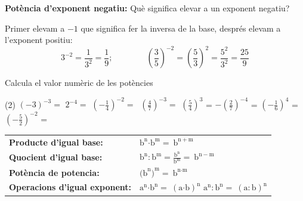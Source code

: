 \begin{theorybox}

 \textbf{Potència d'exponent negatiu: }Què significa elevar a un exponent negatiu?

 Primer elevam a $-1$ que significa fer la inversa de la base, després elevam a l'exponent positiu:
\[{\mathrm{3}}^{\mathrm{-}\mathrm{2}}\mathrm{=}\frac{\mathrm{1}}{{\mathrm{3}}^{\mathrm{2}}}=\frac{1}{9}     ; \quad\quad\quad\quad {\left(\frac{\mathrm{3}}{\mathrm{5}}\right)}^{\mathrm{-}\mathrm{2}}\mathrm{=}{\left(\frac{\mathrm{5}}{\mathrm{3}}\right)}^{\mathrm{2}}=\frac{5^2}{3^2}=\frac{25}{9}\] 

\end{theorybox}

\begin{mylist}
\exer \spen Calcula el valor numèric de les potències
\begin{tasks}(2)
 \task ${\left(-3\right)}^{-3}=$  \task $2^{-4}=$   \task ${\left(-\frac{1}{4}\right)}^{-2}=$  \task$\ {\left(\frac{4}{7}\right)}^{-3}=$
\task $\left(\frac{5}{4}\right)^{3}$ =  \task $-\left(\frac{2}{7}\right)^{-4}$ =  
\task $\left(-\frac{1}{6}\right)^{4}$ = \task $\left(-\frac{5}{2}\right)^{-2}$ =
 \end{tasks}
\end{mylist}


\begin{theorybox}
\begin{minipage}[t]{0.82\textwidth}
	 \begin{tabular}{p{}p{}}
\textbf{Producte d'igual base:}  & ${\mathrm{b}}^{\mathrm{n}}\mathrm{\textrm{·}}{\mathrm{b}}^{\mathrm{m}}\mathrm{=\ }{\mathrm{b}}^{\mathrm{n+m}}$ \\ [0.25cm]

\textbf{Quocient d'igual base:}  & ${\mathrm{b}}^{\mathrm{n}}\mathrm{:}{\mathrm{b}}^{\mathrm{m}}\mathrm{=}\frac{{\mathrm{b}}^{\mathrm{n}}}{{\mathrm{b}}^{\mathrm{m}}}\mathrm{=\ }{\mathrm{b}}^{\mathrm{n-m}}$
\\[0.25cm]
\textbf{Potència de potencia:    } & ${{\mathrm{(b}}^{\mathrm{n}}\mathrm{)}}^{\mathrm{m}}\mathrm{=\ }{\mathrm{b}}^{\mathrm{n\textrm{·}m}}$
\\[0.25cm]
\textbf{Operacions d'igual exponent:} & ${\mathrm{a}}^{\mathrm{n}}\mathrm{\textrm{·}}{\mathrm{b}}^{\mathrm{n}}\mathrm{=\ }{\left(\mathrm{a\textrm{·}b}\right)}^{\mathrm{n}}$ \quad\quad ${\mathrm{a}}^{\mathrm{n}}\mathrm{:}{\mathrm{b}}^{\mathrm{n}}\mathrm{=\ }{\left(\mathrm{a:b}\right)}^{\mathrm{n}}$
\end{tabular}
\end{minipage}
\end{theorybox}

